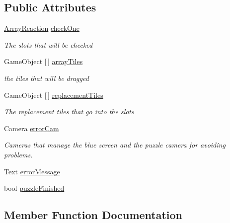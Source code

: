 \subsection*{Public Attributes}
\begin{DoxyCompactItemize}
\item 
\hyperlink{class_array_reaction}{Array\+Reaction} \hyperlink{class_array_access_completion_a5b7d8357b6c82703f06eaabee00d0f2f}{check\+One}
\begin{DoxyCompactList}\small\item\em The slots that will be checked \end{DoxyCompactList}\item 
Game\+Object \mbox{[}$\,$\mbox{]} \hyperlink{class_array_access_completion_ae8c88b6f2dd0fe851c866097911df8e4}{array\+Tiles}
\begin{DoxyCompactList}\small\item\em the tiles that will be dragged \end{DoxyCompactList}\item 
Game\+Object \mbox{[}$\,$\mbox{]} \hyperlink{class_array_access_completion_a97c6ec1f65786273d1186f23ce5b0f6c}{replacement\+Tiles}
\begin{DoxyCompactList}\small\item\em The replacement tiles that go into the slots \end{DoxyCompactList}\item 
Camera \hyperlink{class_array_access_completion_a0e0e013df2a9203aa27344b6090a56aa}{error\+Cam}
\begin{DoxyCompactList}\small\item\em Cameras that manage the blue screen and the puzzle camera for avoiding problems. \end{DoxyCompactList}\item 
Text \hyperlink{class_array_access_completion_a03988dc3e4e687e24f0c2c57d75a03b0}{error\+Message}
\item 
bool \hyperlink{class_array_access_completion_a1cddf9521f110a2868afa36514c9dcb4}{puzzle\+Finished}
\end{DoxyCompactItemize}


\subsection{Member Function Documentation}
\mbox{\label{class_array_access_completion_a16f52bce4f85c9dc5e6f751531988bb0}} 

